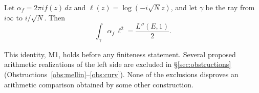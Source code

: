 \begin{proposition}\label{prop:m1}
Let $\alpha_f=2\pi i f(z)\,dz$ and $\ell(z)=\log(-i\sqrt N z)$, and let $\gamma$ be the ray from $i\infty$ to $i/\sqrt N$. Then
\[
\int_\gamma\alpha_f\,\ell^2=\frac{L''(E,1)}{2}.
\]
\end{proposition}
This identity, M1, holds before any finiteness statement. Several proposed arithmetic realizations of the left side are excluded in \S\ref{sec:obstructions} (Obstructions~\ref{obs:mellin}--\ref{obs:curv}). None of the exclusions disproves an arithmetic comparison obtained by some other construction.
